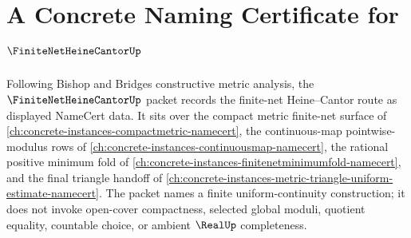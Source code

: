 \chapter{A Concrete Naming Certificate for $\FiniteNetHeineCantorUp$}
\label{ch:concrete-instances-finite-net-heine-cantor-namecert}

Following Bishop and Bridges constructive metric analysis, the $\FiniteNetHeineCantorUp$ packet records the finite-net Heine--Cantor route as displayed NameCert data. It sits over the compact metric finite-net surface of \autoref{ch:concrete-instances-compactmetric-namecert}, the continuous-map pointwise-modulus rows of \autoref{ch:concrete-instances-continuousmap-namecert}, the rational positive minimum fold of \autoref{ch:concrete-instances-finitenetminimumfold-namecert}, and the final triangle handoff of \autoref{ch:concrete-instances-metric-triangle-uniform-estimate-namecert}. The packet names a finite uniform-continuity construction; it does not invoke open-cover compactness, selected global moduli, quotient equality, countable choice, or ambient $\RealUp$ completeness.


